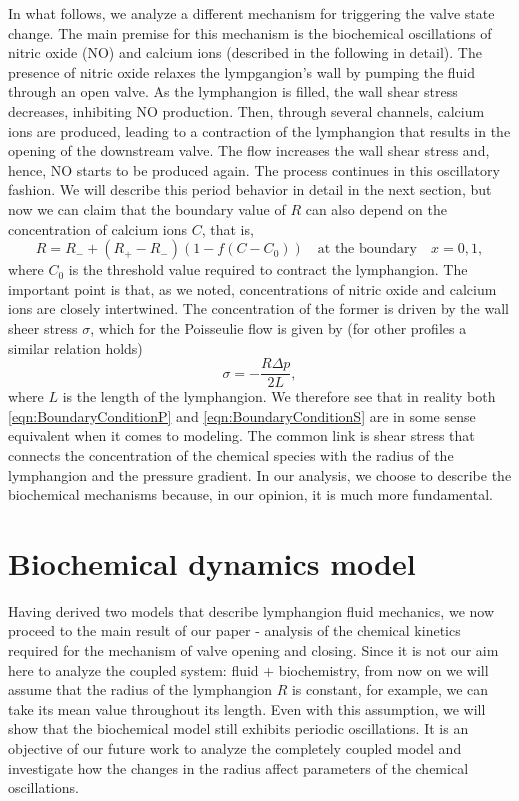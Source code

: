 \documentclass[12pt,a4paper]{article}
\begin{document}
In what follows, we analyze a different mechanism for triggering the valve state change. The main premise for this mechanism is the biochemical oscillations of nitric oxide (NO) and calcium ions (described in the following in detail). The presence of nitric oxide relaxes the lympgangion's wall by pumping the fluid through an open valve. As the lymphangion is filled, the wall shear stress decreases, inhibiting NO production. Then, through several channels, calcium ions are produced, leading to a contraction of the lymphangion that results in the opening of the downstream valve. The flow increases the wall shear stress and, hence, NO starts to be produced again. The process continues in this oscillatory fashion. We will describe this period behavior in detail in the next section, but now we can claim that the boundary value of $R$ can also depend on the concentration of calcium ions $C$, that is,
\begin{equation}
    R = R_- + (R_+ - R_-)(1-f(C - C_0)) \quad \text{at the boundary} \quad x = 0,1, 
\end{equation}
where $C_0$ is the threshold value required to contract the lymphangion. The important point is that, as we noted, concentrations of nitric oxide and calcium ions are closely intertwined. The concentration of the former is driven by the wall sheer stress $\sigma$, which for the Poisseulie flow is given by (for other profiles a similar relation holds)
\begin{equation}\label{eqn:BoundaryConditionS}
    \sigma = - \frac{R\Delta p}{2L},
\end{equation}
where $L$ is the length of the lymphangion. We therefore see that in reality both \eqref{eqn:BoundaryConditionP} and \eqref{eqn:BoundaryConditionS} are in some sense equivalent when it comes to modeling. The common link is shear stress that connects the concentration of the chemical species with the radius of the lymphangion and the pressure gradient. In our analysis, we choose to describe the biochemical mechanisms because, in our opinion, it is much more fundamental. 

\section{Biochemical dynamics model}
Having derived two models that describe lymphangion fluid mechanics, we now proceed to the main result of our paper - analysis of the chemical kinetics required for the mechanism of valve opening and closing. Since it is not our aim here to analyze the coupled system: fluid + biochemistry, from now on we will assume that the radius of the lymphangion $R$ is constant, for example, we can take its mean value throughout its length. Even with this assumption, we will show that the biochemical model still exhibits periodic oscillations. It is an objective of our future work to analyze the completely coupled model and investigate how the changes in the radius affect parameters of the chemical oscillations. 
\end{document}
